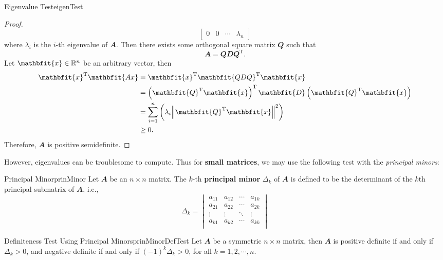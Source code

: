 \documentclass[math, code]{amznotes}
\theoremstyle{remark}
\begin{document}
\begin{thmbox}{Eigenvalue Test}{eigenTest}
\begin{proof}
\begin{displaymath}
\begin{bmatrix}
                0 & 0 & \cdots & \lambda_n
            \end{bmatrix}
        \end{displaymath}
        where $\lambda_i$ is the $i$-th eigenvalue of $\mathbfit{A}$. Then there exists some orthogonal square matrix $\mathbfit{Q}$ such that 
        \begin{equation*}
            \mathbfit{A} = \mathbfit{QDQ}^{\mathrm{T}}.
        \end{equation*}
        Let $\mathbfit{x} \in \R^n$ be an arbitrary vector, then 
        \begin{align*}
            \mathbfit{x}^{\mathrm{T}}\mathbfit{Ax} & = \mathbfit{x}^{\mathrm{T}}\mathbfit{QDQ}^{\mathrm{T}}\mathbfit{x} \\
            & = \left(\mathbfit{Q}^{\mathrm{T}}\mathbfit{x}\right)^{\mathrm{T}}\mathbfit{D}\left(\mathbfit{Q}^{\mathrm{T}}\mathbfit{x}\right) \\
            & = \sum_{i = 1}^{n}\left(\lambda_i\norm{\mathbfit{Q}^{\mathrm{T}}\mathbfit{x}}^2\right) \\
            & \geq 0.
        \end{align*}
        Therefore, $\mathbfit{A}$ is positive semidefinite.
    \end{proof}
\end{thmbox}
However, eigenvalues can be troublesome to compute. Thus for \textbf{small matrices}, we may use the following test with the \textit{principal minors}:
\begin{dfnbox}{Principal Minor}{prinMinor}
    Let $\mathbfit{A}$ be an $n \times n$ matrix. The $k$-th {\color{red} \textbf{principal minor}} $\Delta_k$ of $\mathbfit{A}$ is defined to be the determinant of the $k$th principal submatrix of $\mathbfit{A}$, i.e.,
    \begin{equation*}
        \Delta_k = \begin{vmatrix}
            a_{11} & a_{12} & \cdots & a_{1k} \\
            a_{21} & a_{22} & \cdots & a_{2k} \\
            \vdots & \vdots & \ddots & \vdots \\
            a_{k1} & a_{k2} & \cdots & a_{kk} \\
        \end{vmatrix}
    \end{equation*}
\end{dfnbox}
\begin{thmbox}{Definiteness Test Using Principal Minors}{prinMinorDefTest}
    Let $\mathbfit{A}$ be a symmetric $n \times n$ matrix, then $\mathbfit{A}$ is positive definite if and only if $\Delta_k > 0$, and negative definite if and only if $(-1)^k\Delta_k > 0$, for all $k = 1, 2, \cdots, n$.
\end{thmbox}
\end{document}
